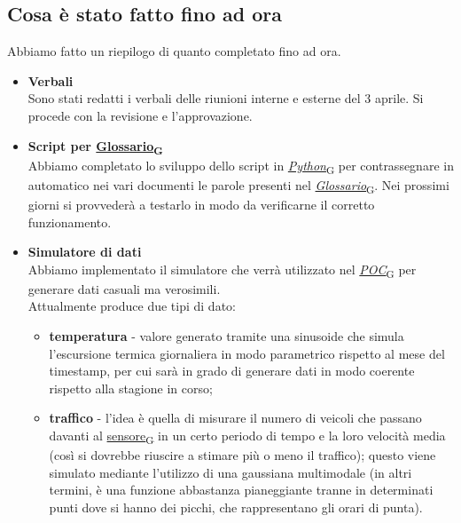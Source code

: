 \documentclass[italian,12pt]{article}
\begin{document}
\subsection{Cosa è stato fatto fino ad ora}
Abbiamo fatto un riepilogo di quanto completato fino ad ora.
\begin{itemize}
	\item \textbf{Verbali} \\
	Sono stati redatti i verbali delle riunioni interne e esterne del 3 aprile. Si procede con la revisione e l'approvazione.
	\item \textbf{Script per \href{https://7last.github.io/docs/rtb/documentazione-interna/glossario\#glossario}{Glossario\textsubscript{G}}} \\
	Abbiamo completato lo sviluppo dello script in \href{https://7last.github.io/docs/rtb/documentazione-interna/glossario#python}{\textit{Python}\textsubscript{G}} per contrassegnare in automatico nei vari documenti le parole presenti nel \href{https://7last.github.io/docs/rtb/documentazione-interna/glossario\#glossario}{\textit{Glossario}\textsubscript{G}}. Nei prossimi giorni si provvederà a testarlo in modo da verificarne il corretto funzionamento.
	\item \textbf{Simulatore di dati} \\
	Abbiamo implementato il simulatore che verrà utilizzato nel \href{https://7last.github.io/docs/rtb/documentazione-interna/glossario#poc}{\textit{POC}\textsubscript{G}} per generare dati casuali ma verosimili. \\
	Attualmente produce due tipi di dato:
	\begin{itemize}
		\item \textbf{temperatura} - valore generato tramite una sinusoide che simula l'escursione termica giornaliera in modo parametrico rispetto al mese del timestamp, per cui sarà in grado di generare dati in modo coerente rispetto alla stagione in corso;
		\item \textbf{traffico} - l'idea è quella di misurare il numero di veicoli che passano davanti al \href{https://7last.github.io/docs/rtb/documentazione-interna/glossario#sensore}{sensore\textsubscript{G}} in un certo periodo di tempo e la loro velocità media (così si dovrebbe riuscire a stimare più o meno il traffico); questo viene simulato mediante l'utilizzo di una gaussiana multimodale (in altri termini, è una funzione abbastanza pianeggiante tranne in determinati punti dove si hanno dei picchi, che rappresentano gli orari di punta).
	\end{itemize}

\end{itemize}
\end{document}
